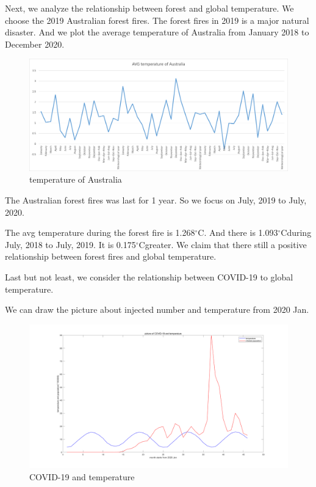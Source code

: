\documentclass{apmcmthesis}
\def\oc{$^{\circ}$C\;}
\begin{document}
Next, we analyze the relationship between forest and global temperature.
We choose the 2019 Australian forest fires.
The forest fires in 2019 is a major natural disaster. 
And we plot the average temperature of Australia from January 2018 to December 2020.

\begin{figure}[htbp]
  \centering
  \includegraphics[scale=0.5]{Australia.png}
  \caption{temperature of Australia}
\end{figure}

The Australian forest fires was last for 1 year.
So we focus on July, 2019 to July, 2020.

The avg temperature during the forest fire is 1.268\oc.
And there is 1.093\oc during July, 2018 to July, 2019.
It is 0.175\oc greater.
We claim that there still a positive relationship between forest fires and global temperature.

Last but not least, we consider the relationship between COVID-19 to global temperature.

We can draw the picture about injected number and temperature from 2020 Jan. 

\begin{figure}[htbp]
  \centering
  \includegraphics[scale=0.2]{COVID-19.png}
  \caption{COVID-19 and temperature}
\end{figure}
\end{document}
